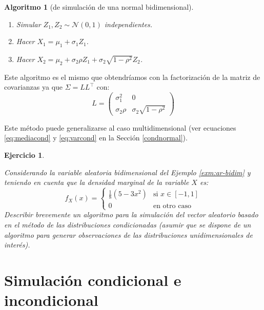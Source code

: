 \documentclass[
  spanish,
  10pt,
]{book}
\theoremstyle{break}
\newtheorem{conjecture}{Algoritmo}[chapter]
\newtheorem{exercise}{Ejercicio}[chapter]
\theoremstyle{nonumberplain}
\begin{document}
\begin{conjecture}[de simulación de una normal bidimensional]
\protect\hypertarget{cnj:norm-bidim-cond}{}\label{cnj:norm-bidim-cond}

\begin{enumerate}
\def\labelenumi{\arabic{enumi}.}
\item
  Simular \(Z_1, Z_2 \sim \mathcal{N}\left( 0, 1 \right)\) independientes.
\item
  Hacer \(X_1 = \mu_1 + \sigma_1 Z_1\).
\item
  Hacer \(X_2 = \mu_2 + \sigma_2 \rho Z_1
  + \sigma_2  \sqrt{1-\rho^2} Z_2\).
\end{enumerate}

\end{conjecture}

Este algoritmo es el mismo que obtendríamos con la factorización de la matriz de covarianzas ya que \(\Sigma = L L^{\top}\) con:
\[L = \begin{pmatrix}
 \sigma^2_1 &  0 \\
 \sigma_2 \rho &  \sigma_2  \sqrt{1-\rho^2}
\end{pmatrix}\]

Este método puede generalizarse al caso multidimensional (ver ecuaciones \eqref{eq:mediacond} y \eqref{eq:varcond} en la Sección \ref{condnormal}).

\begin{exercise}
\protect\hypertarget{exr:cond2d}{}\label{exr:cond2d}

Considerando la variable aleatoria bidimensional del Ejemplo \ref{exm:ar-bidim} y teniendo en cuenta que la densidad marginal de la variable \(X\) es:
\[f_{X}(x)= \left\{ 
\begin{array}{cl}
\frac{1}{8}\left( 5-3x^2\right)  & \text{si }x\in [-1, 1] \\ 
0 & \text{en otro caso}
\end{array}
\right.\]
Describir brevemente un algoritmo para la simulación del vector aleatorio basado en el método de las distribuciones condicionadas (asumir que se dispone de un algoritmo para generar observaciones de las distribuciones unidimensionales de interés).
\end{exercise}

\section{Simulación condicional e incondicional}\label{simulaciuxf3n-condicional-e-incondicional}
\end{document}
